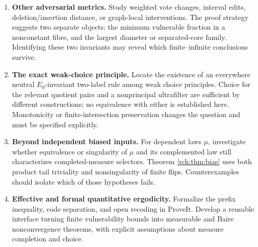 \documentclass[11pt]{article}
\theoremstyle{definition}
\theoremstyle{remark}
\begin{document}
\begin{enumerate}[leftmargin=*,label=\textbf{Q\arabic*.}]
\item \textbf{Other adversarial metrics.}
Study weighted vote changes, interval edits, deletion/insertion distance, or
graph-local interventions. The proof strategy suggests two separate objects:
the minimum vulnerable fraction in a nonconstant fibre, and the largest
diameter or separated-core family. Identifying these two invariants may reveal
which finite--infinite conclusions survive.

\item \textbf{The exact weak-choice principle.}
Locate the existence of an everywhere neutral \(E_0\)-invariant two-label
rule among weak choice principles. Choice for the relevant quotient pairs and
a nonprincipal ultrafilter are sufficient by different constructions; no
equivalence with either is established here. Monotonicity or finite-intersection
preservation changes the question and must be specified explicitly.

\item \textbf{Beyond independent biased inputs.}
For dependent laws \(\mu\), investigate whether equivalence or singularity
of \(\mu\) and its complemented law still characterizes completed-measure
selectors. Theorem \ref{rch:thm:bias} uses both product tail triviality and
nonsingularity of finite flips. Counterexamples should isolate which of those
hypotheses fails.

\item \textbf{Effective and formal quantitative ergodicity.}
Formalize the prefix inequality, code separation, and open recoding in ProveIt.
Develop a reusable interface turning finite vulnerability bounds into measurable
and Baire nonconvergence theorems, with explicit assumptions about measure
completion and choice.
\end{enumerate}
\end{document}
